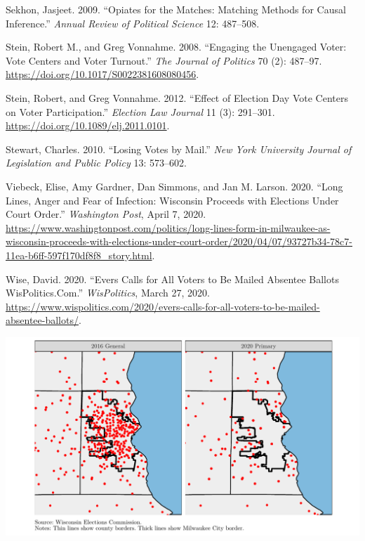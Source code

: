 \documentclass[
  12pt,
]{article}
\newlength{\cslhangindent}
\newenvironment{cslreferences}%
  {\setlength{\parindent}{0pt}%
  \everypar{\setlength{\hangindent}{\cslhangindent}}\ignorespaces}%
  {\par}
\begin{document}
\begin{cslreferences}
\leavevmode\hypertarget{ref-Sekhon2009}{}%
Sekhon, Jasjeet. 2009. ``Opiates for the Matches: Matching Methods for Causal Inference.'' \emph{Annual Review of Political Science} 12: 487--508.

\leavevmode\hypertarget{ref-Stein2008}{}%
Stein, Robert M., and Greg Vonnahme. 2008. ``Engaging the Unengaged Voter: Vote Centers and Voter Turnout.'' \emph{The Journal of Politics} 70 (2): 487--97. \url{https://doi.org/10.1017/S0022381608080456}.

\leavevmode\hypertarget{ref-Stein2012}{}%
Stein, Robert, and Greg Vonnahme. 2012. ``Effect of Election Day Vote Centers on Voter Participation.'' \emph{Election Law Journal} 11 (3): 291--301. \url{https://doi.org/10.1089/elj.2011.0101}.

\leavevmode\hypertarget{ref-Stewart2010}{}%
Stewart, Charles. 2010. ``Losing Votes by Mail.'' \emph{New York University Journal of Legislation and Public Policy} 13: 573--602.

\leavevmode\hypertarget{ref-Viebeck2020}{}%
Viebeck, Elise, Amy Gardner, Dan Simmons, and Jan M. Larson. 2020. ``Long Lines, Anger and Fear of Infection: Wisconsin Proceeds with Elections Under Court Order.'' \emph{Washington Post}, April 7, 2020. \url{https://www.washingtonpost.com/politics/long-lines-form-in-milwaukee-as-wisconsin-proceeds-with-elections-under-court-order/2020/04/07/93727b34-78c7-11ea-b6ff-597f170df8f8_story.html}.

\leavevmode\hypertarget{ref-Wise2020}{}%
Wise, David. 2020. ``Evers Calls for All Voters to Be Mailed Absentee Ballots \textbar{} WisPolitics.Com.'' \emph{WisPolitics}, March 27, 2020. \url{https://www.wispolitics.com/2020/evers-calls-for-all-voters-to-be-mailed-absentee-ballots/}.
\end{cslreferences}

\newpage

\includegraphics{mke_turnout-revised_files/figure-latex/map-1.pdf}
\newpage
\end{document}
